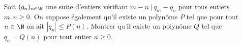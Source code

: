 Soit $(q_n)_{n\in \N}$ une suite d'entiers vérifiant $m-n ~|~ q_m-q_n$ pour tous entiers $m, n\ge 0$. On suppose également qu'il existe un polynôme $P$ tel que pour tout $n\in \N$ on ait $|q_n|\le P(n)$. Montrer qu'il existe un polynôme $Q$ tel que $q_n=Q(n)$ pour tout entier $n\ge 0$.